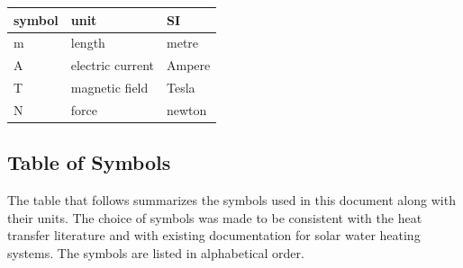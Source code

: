 \documentclass[12pt]{article}
\begin{document}
\renewcommand{\arraystretch}{1.2}
  \noindent \begin{tabular}{l l l} 
    \toprule		
    \textbf{symbol} & \textbf{unit} & \textbf{SI}\\
    \midrule 
    \si{\metre} & length & metre\\
    \si{\ampere} & electric current & Ampere\\
    \si{\tesla} & magnetic field & Tesla\\
     \si{\newton} & force & newton\\
    \bottomrule
  \end{tabular}

\subsection{Table of Symbols}

The table that follows summarizes the symbols used in this document along with
their units.  The choice of symbols was made to be consistent with the heat
transfer literature and with existing documentation for solar water heating
systems.  The symbols are listed in alphabetical order.
\end{document}
